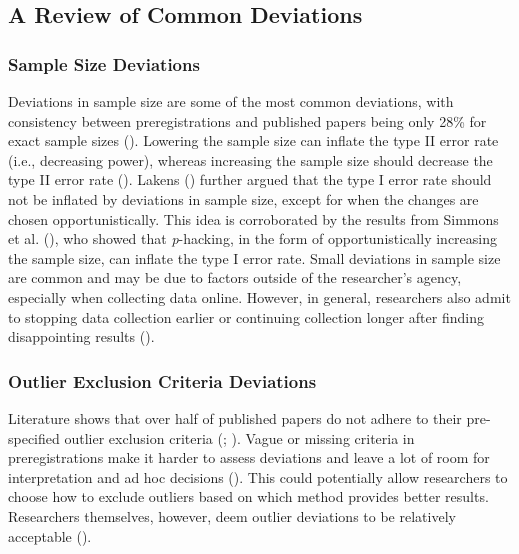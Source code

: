 \documentclass[
  man,
  floatsintext,
  longtable,
  nolmodern,
  notxfonts,
  notimes,
  colorlinks=true,linkcolor=blue,citecolor=blue,urlcolor=blue]{apa7}
\begin{document}
\subsection{A Review of Common
Deviations}\label{a-review-of-common-deviations}

\subsubsection{Sample Size Deviations}\label{sample-size-deviations}

Deviations in sample size are some of the most common deviations, with
consistency between preregistrations and published papers being only
28\% for exact sample sizes (). Lowering the sample size can inflate the
type II error rate (i.e., decreasing power), whereas increasing the
sample size should decrease the type II error rate
(). Lakens
() further argued that the type I error
rate should not be inflated by deviations in sample size, except for
when the changes are chosen opportunistically. This idea is corroborated
by the results from Simmons et al. (),
who showed that \emph{p}-hacking, in the form of opportunistically
increasing the sample size, can inflate the type I error rate. Small
deviations in sample size are common and may be due to factors outside
of the researcher's agency, especially when collecting data online.
However, in general, researchers also admit to stopping data collection
earlier or continuing collection longer after finding disappointing
results ().

\subsubsection{Outlier Exclusion Criteria
Deviations}\label{outlier-exclusion-criteria-deviations}

Literature shows that over half of published papers do not adhere to
their pre-specified outlier exclusion criteria
(;
).
Vague or missing criteria in preregistrations make it harder to assess
deviations and leave a lot of room for interpretation and ad hoc
decisions (). This could
potentially allow researchers to choose how to exclude outliers based on
which method provides better results. Researchers themselves, however,
deem outlier deviations to be relatively acceptable
().
\end{document}
